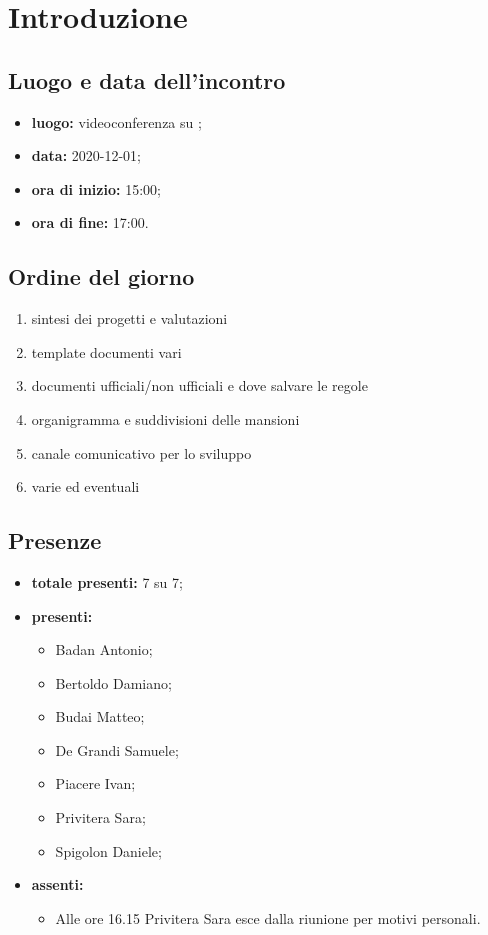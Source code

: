 \section*{Introduzione}

\subsection*{Luogo e data dell'incontro}
	\begin{itemize}
		\item \textbf{luogo:} videoconferenza su ;
		\item \textbf{data:} 2020-12-01;
		\item \textbf{ora di inizio:} 15:00;
		\item \textbf{ora di fine:} 17:00.
	\end{itemize}

\subsection*{Ordine del giorno}
	\begin{enumerate}
			\item sintesi dei progetti e valutazioni
			\item template documenti vari
			\item documenti ufficiali/non ufficiali e dove salvare le regole
			\item organigramma e suddivisioni delle mansioni
			\item canale comunicativo per lo sviluppo
			\item varie ed eventuali
	\end{enumerate}

\subsection*{Presenze}
	\begin{itemize}
		\item \textbf{totale presenti:} 7 su 7;
		\item \textbf{presenti: }
			\begin{itemize}
				\item Badan Antonio;
				\item Bertoldo Damiano;
				\item Budai Matteo;
				\item De Grandi Samuele;
				\item Piacere Ivan;
				\item Privitera Sara;
				\item Spigolon Daniele;
			\end{itemize}
		\item \textbf{assenti: }
			\begin{itemize}
				\item Alle ore 16.15 Privitera Sara esce dalla riunione per motivi personali.
			\end{itemize}
	\end{itemize}


